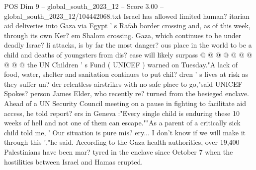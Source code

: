 \begin{textsample}{POS Dim 9 – global\_south\_2023\_12 – Score 3.00 – global\_south\_2023\_12/104442068.txt}
Israel has allowed limited human? itarian aid deliveries into Gaza via Egypt ' s Rafah border crossing and, as of this week, through its own Ker? em Shalom crossing.
Gaza, which continues to be under deadly Israe? li attacks, is by far the most danger? ous place in the world to be a child and deaths of youngsters from dis? ease will likely surpass @ @ @ @ @ @ @ @ @ @ the UN Children ' s Fund ( UNICEF ) warned on Tuesday."A lack of food, water, shelter and sanitation continues to put chil? dren ' s lives at risk as they suffer un? der relentless airstrikes with no safe place to go,"said UNICEF Spokes? person James Elder, who recently re? turned from the besieged enclave.
Ahead of a UN Security Council meeting on a pause in fighting to facilitate aid access, he told report? ers in Geneva :"Every single child is enduring these 10 weeks of hell and not one of them can escape.""As a parent of a critically sick child told me, ' Our situation is pure mis? ery...
I don't know if we will make it through this ',"he said.
According to the Gaza health authorities, over 19,400 Palestinians have been mar? tyred in the enclave since October 7 when the hostilities between Israel and Hamas erupted.

\end{textsample}
